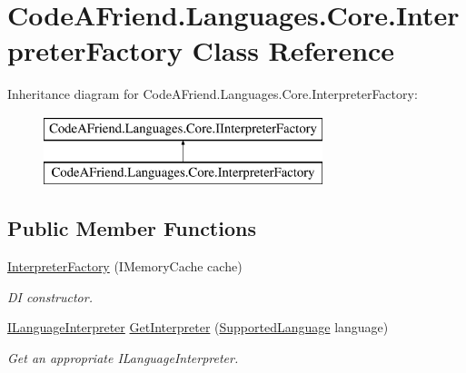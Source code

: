 \hypertarget{class_code_a_friend_1_1_languages_1_1_core_1_1_interpreter_factory}{}\section{Code\+A\+Friend.\+Languages.\+Core.\+Interpreter\+Factory Class Reference}
\label{class_code_a_friend_1_1_languages_1_1_core_1_1_interpreter_factory}
Inheritance diagram for Code\+A\+Friend.\+Languages.\+Core.\+Interpreter\+Factory\+:\begin{figure}[H]
\begin{center}
\leavevmode
\includegraphics[height=2.000000cm]{class_code_a_friend_1_1_languages_1_1_core_1_1_interpreter_factory}
\end{center}
\end{figure}
\subsection*{Public Member Functions}
\begin{DoxyCompactItemize}
\item 
\mbox{\hyperlink{class_code_a_friend_1_1_languages_1_1_core_1_1_interpreter_factory_ae86fb2de2ee28532b67d0e89fcd7bcbb}{Interpreter\+Factory}} (I\+Memory\+Cache cache)
\begin{DoxyCompactList}\small\item\em DI constructor.\end{DoxyCompactList}\item 
\mbox{\hyperlink{interface_code_a_friend_1_1_data_model_1_1_i_language_interpreter}{I\+Language\+Interpreter}} \mbox{\hyperlink{class_code_a_friend_1_1_languages_1_1_core_1_1_interpreter_factory_ac39dea6ec4f5612ecf3ab49a920fc543}{Get\+Interpreter}} (\mbox{\hyperlink{namespace_code_a_friend_1_1_data_model_a13e088c525db1b03a4de75420ced79b2}{Supported\+Language}} language)
\begin{DoxyCompactList}\small\item\em Get an appropriate I\+Language\+Interpreter.  \end{DoxyCompactList}\end{DoxyCompactItemize}


